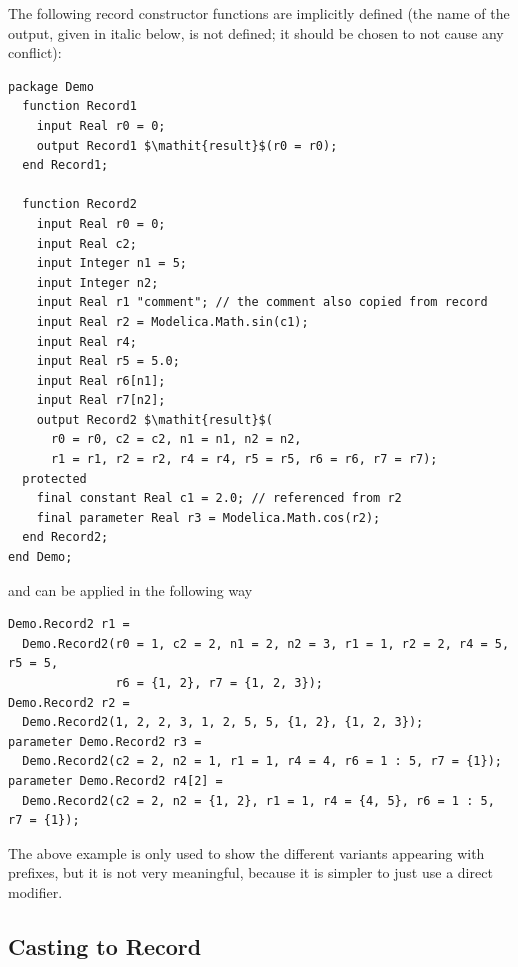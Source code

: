 \begin{nonnormative}
The following record constructor functions are implicitly defined (the name of the output, given in italic below, is not defined; it should be chosen to not cause any conflict):
\begin{lstlisting}[language=modelica,escapechar=!]
package Demo
  function Record1
    input Real r0 = 0;
    output Record1 $\mathit{result}$(r0 = r0);
  end Record1;

  function Record2
    input Real r0 = 0;
    input Real c2;
    input Integer n1 = 5;
    input Integer n2;
    input Real r1 "comment"; // the comment also copied from record
    input Real r2 = Modelica.Math.sin(c1);
    input Real r4;
    input Real r5 = 5.0;
    input Real r6[n1];
    input Real r7[n2];
    output Record2 $\mathit{result}$(
      r0 = r0, c2 = c2, n1 = n1, n2 = n2,
      r1 = r1, r2 = r2, r4 = r4, r5 = r5, r6 = r6, r7 = r7);
  protected
    final constant Real c1 = 2.0; // referenced from r2
    final parameter Real r3 = Modelica.Math.cos(r2);
  end Record2;
end Demo;
\end{lstlisting}
and can be applied in the following way
\begin{lstlisting}[language=modelica]
Demo.Record2 r1 =
  Demo.Record2(r0 = 1, c2 = 2, n1 = 2, n2 = 3, r1 = 1, r2 = 2, r4 = 5, r5 = 5,
               r6 = {1, 2}, r7 = {1, 2, 3});
Demo.Record2 r2 =
  Demo.Record2(1, 2, 2, 3, 1, 2, 5, 5, {1, 2}, {1, 2, 3});
parameter Demo.Record2 r3 =
  Demo.Record2(c2 = 2, n2 = 1, r1 = 1, r4 = 4, r6 = 1 : 5, r7 = {1});
parameter Demo.Record2 r4[2] =
  Demo.Record2(c2 = 2, n2 = {1, 2}, r1 = 1, r4 = {4, 5}, r6 = 1 : 5, r7 = {1});
\end{lstlisting}

The above example is only used to show the different variants appearing with prefixes, but it is not very meaningful, because it is simpler to just use a direct modifier.
\end{nonnormative}

\subsection{Casting to Record}\label{casting-to-record}


